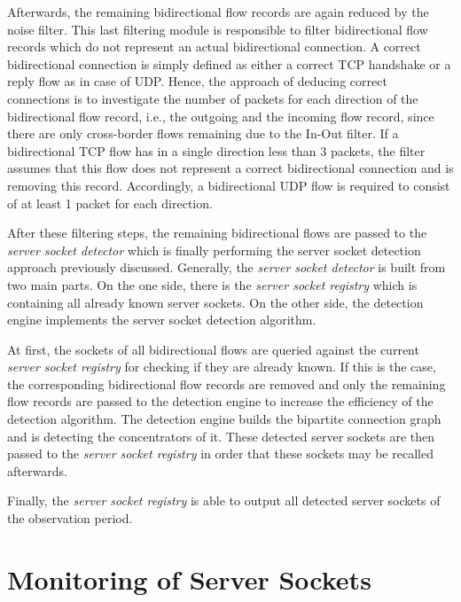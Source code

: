 Afterwards, the remaining bidirectional flow records are again reduced by the noise filter. This last filtering module is responsible to filter bidirectional flow records which do not represent an actual bidirectional connection. A correct bidirectional connection is simply defined as either a correct \gls{TCP} handshake or a reply flow as in case of \gls{UDP}. Hence, the approach of deducing correct connections is to investigate the number of packets for each direction of the bidirectional flow record, i.e., the outgoing and the incoming flow record, since there are only cross-border flows remaining due to the In-Out filter. 
If a bidirectional \gls{TCP} flow has in a single direction less than 3 packets, the filter assumes that this flow does not represent a correct bidirectional connection and is removing this record. Accordingly, a bidirectional \gls{UDP} flow is required to consist of at least 1 packet for each direction. 

After these filtering steps, the remaining bidirectional flows are passed to the \emph{server socket detector} which is finally performing the \gls{server socket} detection approach previously discussed. 
Generally, the \emph{server socket detector} is built from two main parts. On the one side, there is the \emph{server socket registry} which is containing all already known \glspl{server socket}. 
On the other side, the detection engine implements the \gls{server socket} detection algorithm.

At first, the sockets of all bidirectional flows are queried against the current \emph{server socket registry} for checking if they are already known. 
If this is the case, the corresponding bidirectional flow records are removed and only the remaining flow records are passed to the detection engine to increase the efficiency of the detection algorithm. 
The detection engine builds the bipartite connection graph and is detecting the concentrators of it.
These detected \glspl{server socket} are then passed to the \emph{server socket registry} in order that these sockets may be recalled afterwards.

Finally, the \emph{server socket registry} is able to output all detected \glspl{server socket} of the observation period.

\newpage
\section{Monitoring of Server Sockets
\label{section:socket_tracking}}

